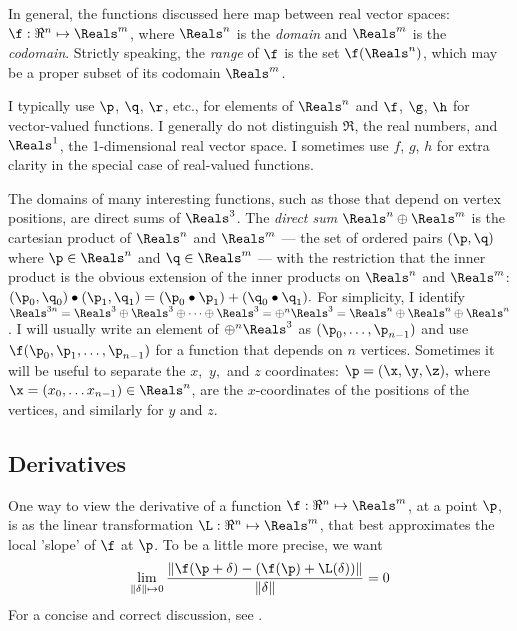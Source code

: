 In general, the functions discussed here map between real vector spaces:
$\f:{\Re}^{n} \mapsto \Reals^{m}$, where $\Reals^n$ is the
{\it domain} and $\Reals^m$ is the {\it codomain}.
Strictly speaking, the {\it range} of $\f$ is the set $\f(\Reals^n)$,
which may be a proper subset of its codomain $\Reals^m$.

I typically use $\p$, $\q$, $\r$, etc., for elements of $\Reals^n$
and
$\f$, $\g$, $\h$ for vector-valued functions.
I generally do not distinguish $\Re$, the real numbers,
and $\Reals^1$, the 1-dimensional real vector space.
I sometimes use $f$, $g$, $h$ for extra clarity in the special
case of real-valued functions.

The domains of many interesting functions,
such as those that depend on vertex positions,
are direct sums of $\Reals^3$.
The {\it direct sum} $\Reals^n \oplus \Reals^m$ is the cartesian product
of $\Reals^n$ and $\Reals^m$ --- the set of ordered pairs $(\p,\q)$
where $\p \in \Reals^n$ and $\q \in \Reals^m$ ---
with the restriction that the inner product is the obvious extension of the
inner products on $\Reals^n$ and $\Reals^m$:
$(\p_0,\q_0) \bullet (\p_1,\q_1) = (\p_0 \bullet \p_1) + (\q_0 \bullet \q_1).$
For simplicity, I identify
$\Reals^{3n} = \Reals^3 \oplus \Reals^3 \oplus \cdots \oplus \Reals^3 = \oplus^n \Reals^3
= \Reals^n \oplus \Reals^n \oplus \Reals^n $.
I will usually write an element of $\oplus^n \Reals^3$ as
$(\p_0,\ldots,\p_{n-1})$
and use
$\f(\p_0,\p_1,\ldots,\p_{n-1})$
for a function that depends on $n$ vertices.
Sometimes it will be useful to separate the $x,$ $y,$ and $z$ coordinates:
$\p = (\x,\y,\z),$
where $\x =(x_0, \ldots x_{n-1}) \in \Reals^n$, are the $x$-coordinates
of the positions of the vertices, and similarly for $y$ and $z$.


\subsection{Derivatives}
\label{sec:derivatives}

One way to view the derivative of a function
$\f:{\Re}^{n} \mapsto \Reals^{m}$,
at a point $\p$,
is as the linear transformation $\L:{\Re}^{n} \mapsto \Reals^{m}$,
that best approximates the local 'slope' of $\f$ at $\p$.
To be a little more precise, we want
\begin{displaymath}
\lim_{ \|{\bf \delta}  \| \mapsto 0}
{ \|{\f(\p + {\bf \delta}) - (\f(\p) + \L({\bf\delta})) \|}
  \over  \|{\bf \delta}  \|}
 = 0
\end{displaymath}
For a concise and correct discussion, see \cite{Spivak:1965:CalculusOnManifolds}.

